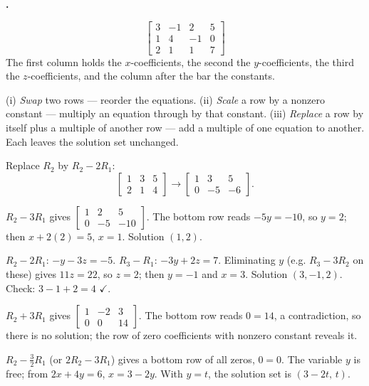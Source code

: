 \documentclass[12pt]{book}
\let\originalcheckmark\checkmark
\renewcommand{\checkmark}{\ensuremath{\originalcheckmark}}
\newcounter{soln}[section]
\newenvironment{solutions}{%
  \setcounter{soln}{0}%
  \begin{list}{\textbf{\arabic{soln}.}}{%
    \usecounter{soln}\setlength{\leftmargin}{2.2em}\setlength{\itemsep}{10pt}}%
}{\end{list}}
\begin{document}
\begin{solutions}
\item
\[
\left[\begin{array}{ccc|c}
3&-1&2&5\\ 1&4&-1&0\\ 2&1&1&7
\end{array}\right]
\]
The first column holds the $x$-coefficients, the second the $y$-coefficients, the
third the $z$-coefficients, and the column after the bar the constants.

\item (i) \emph{Swap} two rows — reorder the equations. (ii) \emph{Scale} a row by a
nonzero constant — multiply an equation through by that constant. (iii) \emph{Replace}
a row by itself plus a multiple of another row — add a multiple of one equation to
another. Each leaves the solution set unchanged.

\item Replace $R_2$ by $R_2-2R_1$:
\[
\left[\begin{array}{cc|c}1&3&5\\ 2&1&4\end{array}\right]
\rightarrow
\left[\begin{array}{cc|c}1&3&5\\ 0&-5&-6\end{array}\right].
\]

\item $R_2-3R_1$ gives $\left[\begin{array}{cc|c}1&2&5\\ 0&-5&-10\end{array}\right]$.
The bottom row reads $-5y=-10$, so $y=2$; then $x+2(2)=5$, $x=1$. Solution $(1,2)$.

\item $R_2-2R_1$: $-y-3z=-5$. $R_3-R_1$: $-3y+2z=7$. Eliminating $y$ (e.g. $R_3-3R_2$
on these) gives $11z=22$, so $z=2$; then $y=-1$ and $x=3$. Solution $(3,-1,2)$. Check:
$3-1+2=4$ \checkmark.

\item $R_2+3R_1$ gives $\left[\begin{array}{cc|c}1&-2&3\\ 0&0&14\end{array}\right]$.
The bottom row reads $0=14$, a contradiction, so there is no solution; the row of zero
coefficients with nonzero constant reveals it.

\item $R_2-\tfrac32 R_1$ (or $2R_2-3R_1$) gives a bottom row of all zeros,
$0=0$. The variable $y$ is free; from $2x+4y=6$, $x=3-2y$. With $y=t$, the solution set
is $(3-2t,\,t)$.


\end{solutions}
\end{document}
